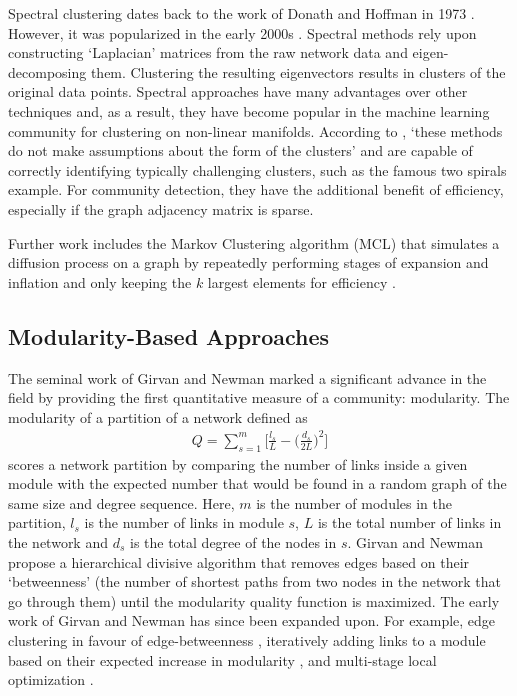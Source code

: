 \documentclass{report}
\begin{document}
	Spectral clustering dates back to the work of Donath and Hoffman in 1973 \cite{donath1973lower}. 
	However, it was popularized in the early 2000s \cite{shi2000normalized,ng2002spectral,ding2004tutorial}. 
	Spectral methods rely upon constructing `Laplacian' matrices from the raw network data and eigen-decomposing them. 
	Clustering the resulting eigenvectors results in clusters of the original data points. 
	Spectral approaches have many advantages over other techniques and, as a result, they have become popular in the machine learning community for clustering  on non-linear manifolds. 
	According to \cite{von2007tutorial}, `these methods do not make assumptions about the form of the clusters' and are capable of correctly identifying typically challenging clusters, such as the famous two spirals example. 
	For community detection, they have the additional benefit of efficiency, especially if the graph adjacency matrix is sparse. 

	Further work includes the Markov Clustering algorithm (MCL) that simulates a diffusion process on a graph by repeatedly performing stages of expansion and inflation and only keeping the $k$ largest elements for efficiency \cite{van2001graph}. 
	
	\subsection{Modularity-Based Approaches}
	The seminal work of Girvan and Newman \cite{girvan2002community} marked a significant advance in the field by providing the first quantitative measure of a community: modularity. 
	The modularity of a partition of a network 
	defined as
	\begin{align} 
	\label{modularity}
	Q = \sum_{s=1}^m \bigg[ \frac{l_s}{L} - \bigg( \frac{d_s}{2L} \bigg)^2\bigg]
	\end{align}
	scores a network partition by comparing the number of links inside a given module with the expected number that would be found in a random graph of the same size and degree sequence. 
	Here, $m$ is the number of modules in the partition, $l_s$ is the number of links in module $s$, $L$ is the total number of links in the network and $d_s$ is the total degree of the nodes in $s$. 
	Girvan and Newman propose a hierarchical divisive algorithm that removes edges based on their `betweenness' (the number of shortest paths from two nodes in the network that go through them) until the modularity quality function is maximized. 
	The early work of Girvan and Newman has since been expanded upon.
	For example, edge clustering in favour of edge-betweenness \cite{radicchi2004defining}, iteratively adding links to a module based on their expected increase in modularity \cite{clauset2004finding}, and multi-stage local optimization \cite{blondel2008fast}.
	
\end{document}
